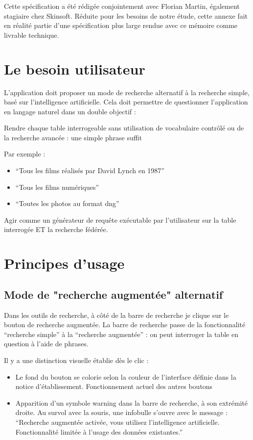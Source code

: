 Cette spécification a été rédigée conjointement avec Florian Martin, également stagiaire chez Skinsoft.
Réduite pour les besoins de notre étude, cette annexe fait en réalité partie d'une spécification plus large rendue avec ce mémoire comme livrable technique. 

\section{Le besoin utilisateur}

L’application doit proposer un mode de recherche alternatif à la recherche simple, basé sur l’intelligence artificielle. Cela doit permettre de questionner l’application en langage naturel dans un double objectif :  

Rendre chaque table interrogeable sans utilisation de vocabulaire contrôlé ou de la recherche avancée : une simple phrase suffit 

Par exemple : 

\begin{itemize}
	\item “Tous les films réalisés par David Lynch en 1987” 
	
	\item “Tous les films numériques” 
	
	\item “Toutes les photos au format dng” 
\end{itemize} 

Agir comme un générateur de requête exécutable par l’utilisateur sur la table interrogée ET la recherche fédérée.  

\section{Principes d'usage}

\subsection{Mode de "recherche augmentée" alternatif \label{infobulle}}

Dans les outils de recherche, à côté de la barre de recherche je clique sur le bouton de recherche augmentée. La barre de recherche passe de la fonctionnalité “recherche simple” à la “recherche augmentée” : on peut interroger la table en question à l’aide de phrases.  

Il y a une distinction visuelle établie dès le clic :  

\begin{itemize}
	\item Le fond du bouton se colorie selon la couleur de l’interface définie dans la notice d’établissement. Fonctionnement actuel des autres boutons 
	
	\item Apparition d’un symbole warning dans la barre de recherche, à son extrémité droite. Au survol avec la souris, une infobulle s’ouvre avec le message : “Recherche augmentée activée, vous utilisez l’intelligence artificielle. Fonctionnalité limitée à l’usage des données existantes.”  
\end{itemize}


